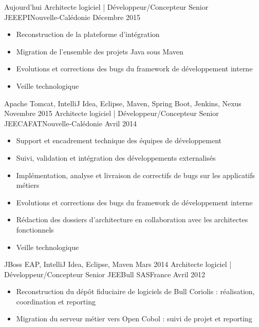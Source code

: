 %
%
%
\begin{experiences}
  \experience
  {Aujourd'hui}   {Architecte logiciel | Développeur/Concepteur Senior JEE}{EPI}{Nouvelle-Calédonie}
  {Décembre 2015} {
    \begin{itemize}
      \item Reconstruction de la plateforme d'intégration
      \item Migration de l'ensemble des projets Java sous Maven
      \item Evolutions et corrections des bugs du framework de développement interne
      \item Veille technologique
    \end{itemize}
  }
  {Apache Tomcat, IntelliJ Idea, Eclipse, Maven, Spring Boot, Jenkins, Nexus}
  \emptySeparator
  \experience
  {Novembre 2015} {Architecte logiciel | Développeur/Concepteur Senior JEE}{CAFAT}{Nouvelle-Calédonie}
  {Avril 2014}    {
    \begin{itemize}
      \item Support et encadrement technique des équipes de développement
      \item Suivi, validation et intégration des développements externalisés
      \item Implémentation, analyse et livraison de correctifs de bugs sur les applicatifs métiers
      \item Evolutions et corrections des bugs du framework de développement interne
      \item Rédaction des dossiers d'architecture en collaboration avec les architectes fonctionnels
      \item Veille technologique
    \end{itemize}
  }
  {JBoss EAP, IntelliJ Idea, Eclipse, Maven}
  \emptySeparator
  \experience
  {Mars 2014}     {Architecte logiciel | Développeur/Concepteur Senior JEE}{Bull SAS}{France}
  {Avril 2012}    {
    \begin{itemize}
      \item Reconstruction du dépôt fiduciaire de logiciels de Bull Coriolis : réalisation, coordination et reporting
      \item Migration du serveur métier vers Open Cobol : suivi de projet et reporting

\end{itemize}}
\end{experiences}
